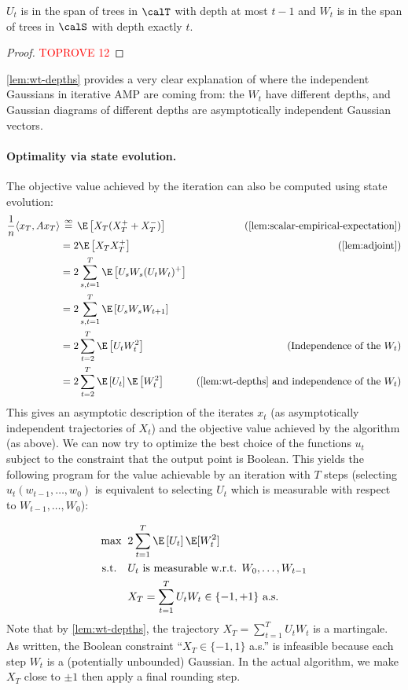 \documentclass[12pt]{article}
\newcommand{\eqinf}{\,\overset{\infty}{=}\,}
\begin{document}
\begin{claim}\label{lem:wt-depths}
    $U_t$ is in the span of trees in $\calT$ with depth at most $t-1$ and $W_t$ is in the span of trees in $\calS$ with depth exactly $t$.
\end{claim}
\begin{proof}\textcolor{red}{TOPROVE 12}\end{proof}
\cref{lem:wt-depths} provides a very
clear explanation of where the independent Gaussians in iterative AMP are coming from:
the $W_t$ have different depths, and Gaussian diagrams of different depths are asymptotically independent Gaussian vectors.

\paragraph{Optimality via state evolution.} The objective value achieved by the iteration can also be computed using state evolution:
\begin{align*}
    \frac 1n \langle  x_T, A x_T\rangle &\eqinf \E\left[X_T (X_T^+ + X_T^-)\right] & (\text{\cref{lem:scalar-empirical-expectation}})\\
    &= 2\E\left[X_T X_T^+\right] & (\text{\cref{lem:adjoint}})\\
    &= 2\sum_{s,t = 1}^T \E\left[U_s W_s (U_t W_t)^+\right]\\
    &= 2\sum_{s,t = 1}^T \E\left[U_s W_s W_{t+1}\right]\\
    &= 2\sum_{t = 2}^T \E\left[U_t W_t^2\right] & (\text{Independence of the $W_t$})\\
    &= 2\sum_{t = 2}^T \E\left[U_t\right] \E\left[W_t^2\right] & (\text{\cref{lem:wt-depths} and independence of the $W_t$})
\end{align*}
This gives an asymptotic description of the iterates $x_t$ (as asymptotically independent trajectories of $X_t$) and the objective value achieved by the algorithm (as above). We can now try to optimize
the best choice of the functions $u_t$ subject
to the constraint that the output point is Boolean.
This yields the following program for the value achievable by an iteration with $T$ steps (selecting $u_t(w_{t-1}, \dots, w_0)$ is equivalent to selecting $U_t$ which is measurable with respect to $W_{t-1}, \dots, W_0$):

\begin{align*}
    \max \;\;& 2\sum_{t=1}^T \E\left[U_t\right] \E[W_t^2]\\
    \textnormal{s.t. }\;\;
    &U_t \text{ is measurable w.r.t. $W_0, \dots, W_{t-1}$}\\
    &X_T = \sum_{t = 1}^T U_t W_t \in \{-1,+1\} \text{ a.s.}
\end{align*}
Note that by \cref{lem:wt-depths}, the trajectory $X_T = \sum_{t = 1}^T U_tW_t$ is a martingale.
As written, the Boolean constraint ``$X_T \in \{-1,1\}$ a.s.'' is infeasible because each step $W_t$ is a (potentially unbounded) Gaussian.
In the actual algorithm, we make $X_T$ close to $\pm 1$ then apply a final rounding step.
\end{document}
